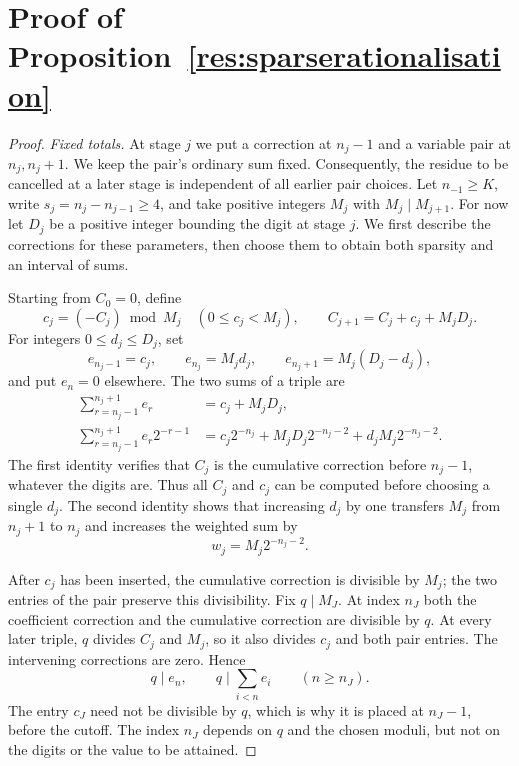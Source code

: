 \documentclass[11pt]{article}
\begin{document}
\section{Proof of Proposition~\ref{res:sparserationalisation}}\label{sec:construction}
\begin{proof}
\emph{Fixed totals.}
At stage $j$ we put a correction at $n_j-1$ and a variable pair at
$n_j,n_j+1$.  We keep the pair's ordinary sum fixed.  Consequently, the residue to be
cancelled at a later stage is independent of all earlier pair choices.
Let $n_{-1}\ge K$, write $s_j=n_j-n_{j-1}\ge4$, and take positive
integers $M_j$ with $M_j\mid M_{j+1}$.  For now let $D_j$ be a positive
integer bounding the digit at stage $j$.  We first describe the corrections
for these parameters, then choose them to obtain both sparsity and an
interval of sums.

Starting from $C_0=0$, define
\[
 c_j=(-C_j)\bmod M_j\quad(0\le c_j<M_j),\qquad
 C_{j+1}=C_j+c_j+M_jD_j.
\]
For integers $0\le d_j\le D_j$, set
\begin{equation}\label{eq:correction-triple}
 e_{n_j-1}=c_j,\qquad e_{n_j}=M_jd_j,\qquad
 e_{n_j+1}=M_j(D_j-d_j),
\end{equation}
and put $e_n=0$ elsewhere.  The two sums of a triple are
\[
 \begin{aligned}
 \sum_{r=n_j-1}^{n_j+1}e_r
    &=c_j+M_jD_j,\\
 \sum_{r=n_j-1}^{n_j+1}e_r2^{-r-1}
    &=c_j2^{-n_j}+M_jD_j2^{-n_j-2}+d_jM_j2^{-n_j-2}.
 \end{aligned}
\]
The first identity verifies that $C_j$ is the cumulative correction
before $n_j-1$, whatever the digits are.  Thus all $C_j$ and $c_j$
can be computed before choosing a single $d_j$.  The second identity
shows that increasing $d_j$ by one transfers $M_j$ from $n_j+1$ to
$n_j$ and increases the weighted sum by
\[
 w_j=M_j2^{-n_j-2}.
\]

After $c_j$ has been inserted, the cumulative correction is divisible
by $M_j$; the two entries of the pair preserve this divisibility.
Fix $q\mid M_J$.  At index $n_J$ both the coefficient correction and
the cumulative correction are divisible by $q$.  At every later
triple, $q$ divides $C_j$ and $M_j$, so it also divides $c_j$ and
both pair entries.  The intervening corrections are zero.  Hence
\[
 q\mid e_n,\qquad q\mid\sum_{i<n}e_i\qquad(n\ge n_J).
\]
The entry $c_J$ need not be divisible by $q$, which is why it is placed at
$n_J-1$, before the cutoff.  The index $n_J$ depends on $q$ and the chosen
moduli, but not on the digits or the value to be attained.


\end{proof}
\end{document}
